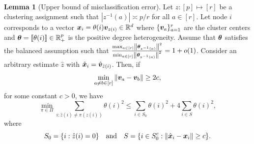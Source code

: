 \documentclass[lettersize,onecolumn,journal]{IEEEtran}
\theoremstyle{definition}
\newtheorem{lem}{Lemma}
\theoremstyle{definition}
\begin{document}
\begin{lem}[Upper bound of misclassification error]\label{lem:upper_mis} Let $z: [p] \mapsto [r]$ be a clustering assignment such that $|z^{-1}(a)| \asymp p/r$ for all $a \in [r]$. Let node $i$ corresponds to a vector $\bm x_i  = \theta(i) \bm{v}_{z(i)} \in \mathbb{R}^d$ where $\{\bm{v}_a\}_{a = 1}^r$ are the cluster centers and $\boldsymbol{\theta} = \llbracket \theta(i) \rrbracket \in \mathbb{R}^p_+$ is the positive degree heterogeneity. Assume that  $\boldsymbol{\theta}$ satisfies the balanced assumption such that ${\max_{a \in [r]} \left\lVert\boldsymbol{\theta}_{z^{-1}(a)}\right\rVert^2 \over \min_{a \in [r]} \left\lVert\boldsymbol{\theta}_{z^{-1}(a)}\right\rVert^2 }= 1 + o(1)$. Consider an arbitrary estimate $\hat z$ with $\hat {\bm x}_i = \hat {\bm{v}}_{\hat z(i)}$. Then, if
\begin{equation}
    \min_{a \neq b \in [r]} \left\lVert\bm{v}_a - \bm{v}_b\right\rVert \geq 2c,
\end{equation}
 for some constant $c >0$, we have 
\begin{equation}
    \min_{\pi \in \Pi} \sum_{i : \hat z(i) \neq \pi(z(i))} \theta(i)^2 \leq \sum_{i \in S_0} \theta(i)^2 + 4 \sum_{i \in S} \theta(i)^2,
\end{equation}
where 
\begin{equation}
    S_0 = \{i: \hat z(i) = 0\} \quad  \text{and}  \quad S = \{i \in S_0^c: \left\lVert\hat {\bm x}_i - \bm x_i \right\rVert \geq c \}.
\end{equation}

\end{lem}
\end{document}

